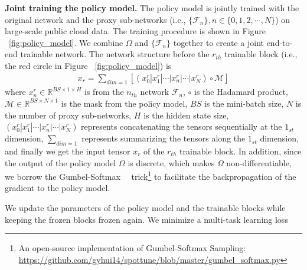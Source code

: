 
\noindent \textbf{Joint training the policy model.}
The policy model is jointly trained with the original network and the proxy sub-networks (i.e., $\{\mathcal{F}_{n}\}, n \in \{0, 1, 2, \cdots, N\}$) on large-scale public cloud data.
The training procedure is shown in Figure ~\ref{fig:policy_model}.
We combine $\Omega$ and $\{\mathcal{F}_{n}\}$ together to create a joint end-to-end trainable network.
The network structure before the $r_{th}$ trainable block (i.e., the red circle in Figure ~\ref{fig:policy_model}) is %
\begin{align}
        x_{r} = \sum_{dim=1}[(x_{0}^{r}|x_{1}^{r}|\cdots|x_{n}^{r}|\cdots|x_{N}^{r}) \circ \mathcal{M}] 
	\label{eq-policy_model_tuning_structure}
\end{align}
where $x_{n}^{r} \in \mathbb{R}^{BS \times 1 \times H}$ is from the $n_{th}$ network $\mathcal{F}_{n}$, $\circ$ is the Hadamard product, $\mathcal{M} \in \mathbb{R}^{BS \times N \times 1}$ is the mask from the policy model, $BS$ is the mini-batch size, $N$ is the number of proxy sub-networks, $H$ is the hidden state size, $(x_{0}^{r}|x_{1}^{r}|\cdots|x_{n}^{r}|\cdots|x_{N}^{r})$ represents concatenating the tensors sequentially at the $1_{st}$ dimension, $\sum_{dim=1}$ represents summarizing the tensors along the $1_{st}$ dimension, and finally we get the input tensor $x_{r}$ of the $r_{th}$ trainable block.
In addition, since the output of the policy model $\Omega$ is discrete, which makes $\Omega$ non-differentiable, we borrow the Gumbel-Softmax~~\cite{jang2017categorical} trick\footnote{An open-source implementation of Gumbel-Softmax Sampling: \url{https://github.com/gyhui14/spottune/blob/master/gumbel_softmax.py}} to facilitate the backpropagation of the gradient to the policy model.

We update the parameters of the policy model and the trainable blocks while keeping the frozen blocks frozen again.
We minimize a multi-task learning loss

